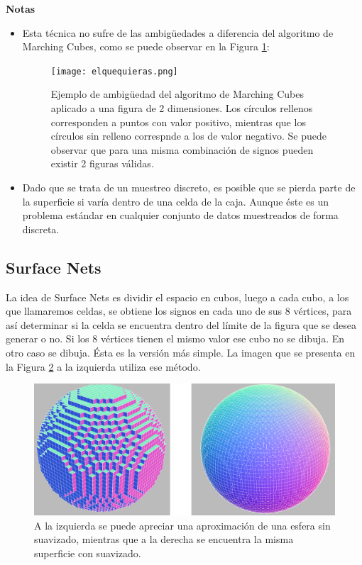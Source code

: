 \documentclass[12pt]{article}
\begin{document}
\textbf{Notas}
\begin{itemize}
\item Esta técnica no sufre de las ambigüedades a diferencia del algoritmo de Marching Cubes, como se puede observar en la Figura \ref{ambig}:
\begin{figure}[h!]
\texttt{[image: elquequieras.png]}
\caption{Ejemplo de ambigüedad del algoritmo de Marching Cubes aplicado a una figura de 2 dimensiones. Los círculos rellenos corresponden a puntos con valor positivo, mientras que los círculos sin relleno correspnde a los de valor negativo. Se puede observar que para una misma combinación de signos pueden existir 2 figuras válidas.}
\label{ambig}
\end{figure}
\item Dado que se trata de un muestreo discreto, es posible que se pierda parte de la superficie si varía dentro de una celda de la caja. Aunque éste es un problema estándar en cualquier conjunto de datos muestreados de forma discreta.
\end{itemize}

\subsection{Surface Nets}
\noindent La idea de Surface Nets es dividir el espacio en cubos, luego a cada cubo, a los que llamaremos celdas, se obtiene los signos en cada uno de sus 8 vértices, para así determinar si la celda se encuentra dentro del límite de la figura que se desea generar o no. Si los 8 vértices tienen el mismo valor ese cubo no se dibuja. En otro caso se dibuja. Ésta es la versión más simple. La imagen que se presenta en la Figura \ref{minecraft} a la izquierda utiliza ese método.
\begin{figure}[h]
\includegraphics[width =\linewidth,center]{snc.png}
\caption{ A la izquierda se puede apreciar una aproximación de una esfera sin suavizado, mientras que a la derecha se encuentra la misma superficie con suavizado.}
\label{minecraft}
\end{figure}
\end{document}
